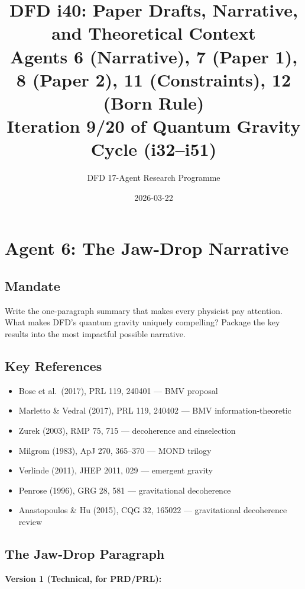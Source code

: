 \documentclass[11pt,a4paper]{article}
\title{DFD i40: Paper Drafts, Narrative, and Theoretical Context\\[6pt]
\large Agents 6 (Narrative), 7 (Paper 1), 8 (Paper 2), 11 (Constraints), 12 (Born Rule)\\[6pt]
\normalsize Iteration 9/20 of Quantum Gravity Cycle (i32--i51)}
\author{DFD 17-Agent Research Programme}
\date{2026-03-22}
\begin{document}
\maketitle
\tableofcontents
\newpage

\section{Agent 6: The Jaw-Drop Narrative}
\label{sec:agent6}

\subsection{Mandate}

Write the one-paragraph summary that makes every physicist pay attention. What makes DFD's quantum gravity uniquely compelling? Package the key results into the most impactful possible narrative.

\subsection{Key References}

\begin{itemize}
\item Bose et al.\ (2017), PRL 119, 240401 --- BMV proposal
\item Marletto \& Vedral (2017), PRL 119, 240402 --- BMV information-theoretic
\item Zurek (2003), RMP 75, 715 --- decoherence and einselection
\item Milgrom (1983), ApJ 270, 365--370 --- MOND trilogy
\item Verlinde (2011), JHEP 2011, 029 --- emergent gravity
\item Penrose (1996), GRG 28, 581 --- gravitational decoherence
\item Anastopoulos \& Hu (2015), CQG 32, 165022 --- gravitational decoherence review
\end{itemize}

\subsection{The Jaw-Drop Paragraph}

\textbf{Version 1 (Technical, for PRD/PRL):}
\end{document}
